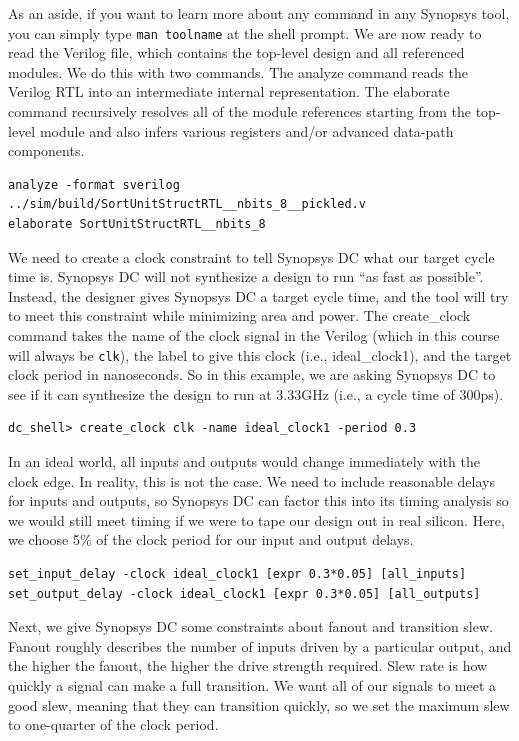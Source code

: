 \documentclass[a4paper,12pt,twoside]{article}
\begin{document}
As an aside, if you want to learn more about any command in any Synopsys tool, you can simply type \texttt{man toolname} at the shell prompt. We are now ready to read the Verilog file, which contains the top-level design and all referenced modules. We do this with two commands. The analyze command reads the Verilog RTL into an intermediate internal representation. The elaborate command recursively resolves all of the module references starting from the top-level module and also infers various registers and/or advanced data-path components.
\begin{verbatim}
analyze -format sverilog ../sim/build/SortUnitStructRTL__nbits_8__pickled.v
elaborate SortUnitStructRTL__nbits_8
\end{verbatim}
We need to create a clock constraint to tell Synopsys DC what our target cycle time is. Synopsys DC will not synthesize a design to run “as fast as possible”. Instead, the designer gives Synopsys DC a target cycle time, and the tool will try to meet this constraint while minimizing area and power. The create\_clock command takes the name of the clock signal in the Verilog (which in this course will always be \texttt{clk}), the label to give this clock (i.e., ideal\_clock1), and the target clock period in nanoseconds. So in this example, we are asking Synopsys DC to see if it can synthesize the design to run at 3.33GHz (i.e., a cycle time of 300ps).
\begin{verbatim}
dc_shell> create_clock clk -name ideal_clock1 -period 0.3
\end{verbatim}
In an ideal world, all inputs and outputs would change immediately with the clock edge. In reality, this is not the case. We need to include reasonable delays for inputs and outputs, so Synopsys DC can factor this into its timing analysis so we would still meet timing if we were to tape our design out in real silicon. Here, we choose 5\% of the clock period for our input and output delays.
\begin{verbatim}
set_input_delay -clock ideal_clock1 [expr 0.3*0.05] [all_inputs]
set_output_delay -clock ideal_clock1 [expr 0.3*0.05] [all_outputs]
\end{verbatim}
Next, we give Synopsys DC some constraints about fanout and transition slew. Fanout roughly describes the number of inputs driven by a particular output, and the higher the fanout, the higher the drive strength required. Slew rate is how quickly a signal can make a full transition. We want all of our signals to meet a good slew, meaning that they can transition quickly, so we set the maximum slew to one-quarter of the clock period.
\end{document}
